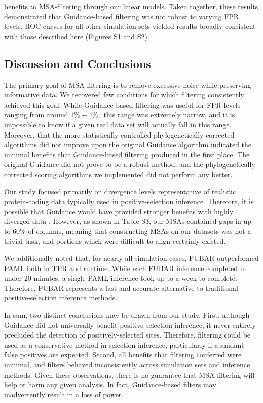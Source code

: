 \documentclass[11pt]{article}
\begin{document}
benefits to MSA-filtering through our linear models. Taken together, these results demonstrated that Guidance-based filtering was not robust to varying FPR levels. ROC curves for all other simulation sets yielded results broadly consistent with those described here (Figures S1 and S2).

\subsection*{Discussion and Conclusions}

The primary goal of MSA filtering is to remove excessive noise while preserving informative data. We recovered few conditions for which filtering consistently achieved this goal. While Guidance-based filtering was useful for FPR levels ranging from around $1\% - 4\%,$ this range was extremely narrow, and it is impossible to know if a given real data set will actually fall in this range. Moreover, that the more statistically-controlled phylogenetically-corrected algorithms did not improve upon the original Guidance algorithm indicated the minimal benefits that Guidance-based filtering produced in the first place. The original Guidance did not prove to be a robust method, and the phylogenetically-corrected scoring algorithms we implemented did not perform any better.

Our study focused primarily on divergence levels representative of realistic protein-coding data typically used in positive-selection inference. Therefore, it is possible that Guidance would have provided stronger benefits with highly diverged data \citep{Privman2012}. However, as shown in Table S3, our MSAs contained gaps in up to 60\% of columns, meaning that constructing MSAs on our datasets was not a trivial task, and portions which were difficult to align certainly existed.

We additionally noted that, for nearly all simulation cases, FUBAR outperformed PAML both in TPR and runtime. While each FUBAR inference completed in under 20 minutes, a single PAML inference took up to a week to complete. Therefore, FUBAR represents a fast and accurate alternative to traditional positive-selection inference methods.

In sum, two distinct conclusions may be drawn from our study. First, although Guidance did not universally benefit positive-selection inference, it never entirely precluded the detection of positively-selected sites. Therefore, filtering could be used as a conservative method in selection inference, particularly if abundant false positives are expected. Second, all benefits that filtering conferred were minimal, and filters behaved inconsistently across simulation sets and inference methods. Given these observations, there is no guarantee that MSA filtering will help or harm any given analysis. In fact, Guidance-based filters may inadvertently result in a loss of power. 
\end{document}
